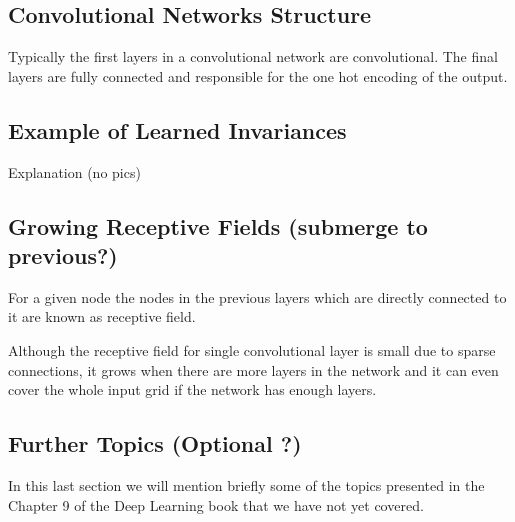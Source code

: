 \documentclass[]{article}
\begin{document}
\subsection{Convolutional Networks Structure}
Typically the first layers in a convolutional network are convolutional. The final
layers are fully connected and responsible for the one hot encoding of the output.


\subsection{Example of Learned Invariances}
Explanation (no pics)

%

\subsection{Growing Receptive Fields (submerge to previous?)}
For a given node the nodes in the previous layers which are directly connected
to it are known as receptive field.

Although the receptive field for single convolutional layer is small due to sparse
connections, it grows when there are more layers in the network and it can even
cover the whole input grid if the network has enough layers.

\subsection{Further Topics (Optional ?)}
In this last section we will mention briefly some of the topics presented in the
Chapter 9 of the Deep Learning book that we have not yet covered.
\end{document}
